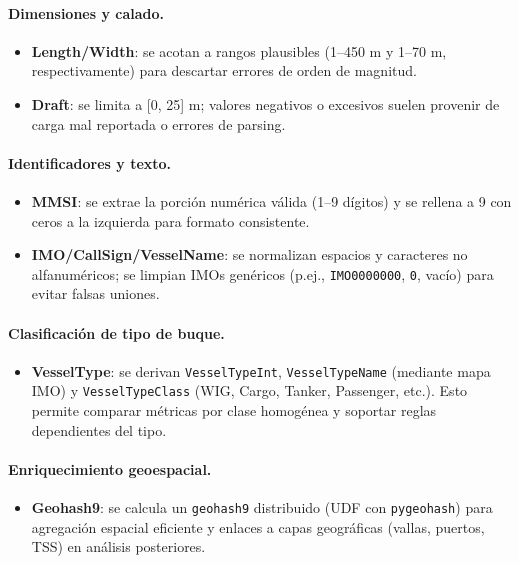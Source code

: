 \documentclass[10pt]{article}
\begin{document}
\paragraph{Dimensiones y calado.}
\begin{itemize}
  \item \textbf{Length/Width}: se acotan a rangos plausibles (1–450 m y 1–70 m, respectivamente) para descartar errores de orden de magnitud.
  \item \textbf{Draft}: se limita a [0, 25] m; valores negativos o excesivos suelen provenir de carga mal reportada o errores de parsing.
\end{itemize}

\paragraph{Identificadores y texto.}
\begin{itemize}
  \item \textbf{MMSI}: se extrae la porción numérica válida (1–9 dígitos) y se rellena a 9 con ceros a la izquierda para formato consistente.
  \item \textbf{IMO/CallSign/VesselName}: se normalizan espacios y caracteres no alfanuméricos; se limpian IMOs genéricos (p.ej., \texttt{IMO0000000}, \texttt{0}, vacío) para evitar falsas uniones.
\end{itemize}

\paragraph{Clasificación de tipo de buque.}
\begin{itemize}
  \item \textbf{VesselType}: se derivan \texttt{VesselTypeInt}, \texttt{VesselTypeName} (mediante mapa IMO) y \texttt{VesselTypeClass} (WIG, Cargo, Tanker, Passenger, etc.). Esto permite comparar métricas por clase homogénea y soportar reglas dependientes del tipo.
\end{itemize}

\paragraph{Enriquecimiento geoespacial.}
\begin{itemize}
  \item \textbf{Geohash9}: se calcula un \texttt{geohash9} distribuido (UDF con \texttt{pygeohash}) para agregación espacial eficiente y enlaces a capas geográficas (vallas, puertos, TSS) en análisis posteriores.
\end{itemize}
\end{document}

